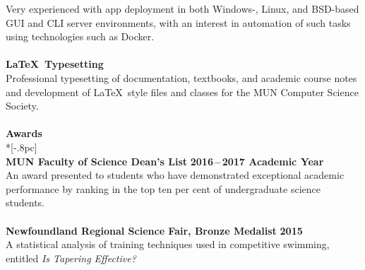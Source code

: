 \documentclass[letterpaper]{article}
\let\dateshape\bf
\begin{document}
Very experienced with app deployment in both Windows-, Linux, and BSD-based GUI and CLI server environments, with an interest in automation of such tasks using technologies such as Docker. \\
\\
{\bf \LaTeX\ Typesetting} \\
Professional typesetting of documentation, textbooks, and academic course notes and development of \LaTeX\ style files and classes for the MUN Computer Science Society. \\
\\[0.5pc] %
{\large \bf Awards} \\*[-.8pc]
\underline{\hspace{\textwidth}} \\[0.5pc]
{\bf MUN Faculty of Science Dean's List} \hfill {\dateshape 2016\,--\,2017 Academic Year} \\
An award presented to students who have demonstrated exceptional academic performance by ranking in the top ten per cent of undergraduate science students. \\
\\
{\bf Newfoundland Regional Science Fair, Bronze Medalist} \hfill {\dateshape 2015\/} \\
A statistical analysis of training techniques used in competitive swimming, 
entitled {\it Is Tapering Effective?} \\
\\[0.5pc] 
\end{document}
